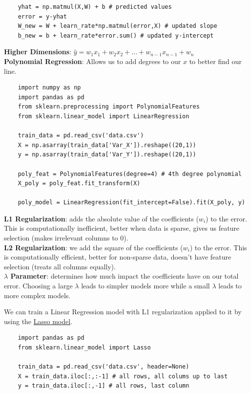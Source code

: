 \documentclass[11pt, a4paper]{article}
\begin{document}
\begin{spacing}{1.1}
\begin{lstlisting}
	yhat = np.matmul(X,W) + b # predicted values
	error = y-yhat
	W_new = W + learn_rate*np.matmul(error,X) # updated slope
	b_new = b + learn_rate*error.sum() # updated y-intercept \end{lstlisting}\vspace*{3mm}
	\textbf{Higher Dimensions}: $\hat{y} = w_1x_1 + w_2x_2 + ... + w_{n-1}x_{n-1} + w_n$ \vspace*{2mm}\\
	\textbf{Polynomial Regression}: Allows us to add degrees to our $x$ to better find our line.
	\begin{lstlisting}
	import numpy as np
	import pandas as pd
	from sklearn.preprocessing import PolynomialFeatures
	from sklearn.linear_model import LinearRegression
	
	train_data = pd.read_csv('data.csv')
	X = np.asarray(train_data['Var_X']).reshape((20,1))
	y = np.asarray(train_data['Var_Y']).reshape((20,1))
	
	poly_feat = PolynomialFeatures(degree=4) # 4th degree polynomial
	X_poly = poly_feat.fit_transform(X)
	
	poly_model = LinearRegression(fit_intercept=False).fit(X_poly, y) \end{lstlisting}\vspace*{3mm}
	\textbf{L1 Regularization}: adds the absolute value of the coefficients ($w_i$) to the error. This is computationally inefficient, better when data is sparse, gives us feature selection (makes irrelevant columns to 0). \vspace*{2mm}\\
	\textbf{L2 Regularization}: we add the square of the coefficients ($w_i$) to the error. This is computationally efficient, better for non-sparse data, doesn't have feature selection (treats all columns equally).  \vspace*{2mm}\\
	\textbf{$\mathbb{\lambda}$ Parameter}: determines how much impact the coefficients have on our total error. Choosing a large $\lambda$ leads to simpler models more while a small $\lambda$ leads to more complex models. \newpage

	\noindent We can train a Linear Regression model with L1 regularization applied to it by using the \href{https://scikit-learn.org/stable/modules/generated/sklearn.linear_model.Lasso.html}{Lasso model}.
	\begin{lstlisting}
	import pandas as pd
	from sklearn.linear_model import Lasso
	
	train_data = pd.read_csv('data.csv', header=None)
	X = train_data.iloc[:,:-1] # all rows, all colums up to last
	y = train_data.iloc[:,-1] # all rows, last column
	

\end{lstlisting}
\end{spacing}
\end{document}
